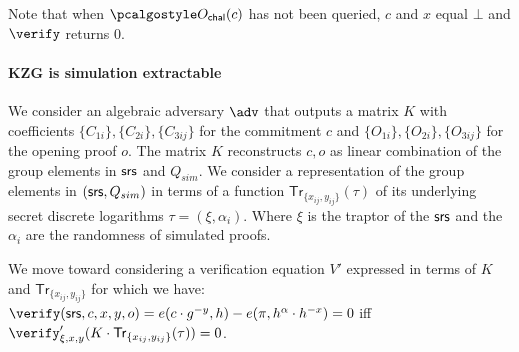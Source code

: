 \documentclass[runningheads,11pt]{llncs}
\begin{document}
\begin{definition}
\end{definition}
Note that when $\oraclec(c)$ has not been queried, $c$ and $x$ equal $\bot$ and $\verify$ returns $0$.

\paragraph{KZG is simulation extractable}

We consider an algebraic adversary $\adv$ that outputs a matrix $K$ with coefficients $\{C_{{1i}}\},\{C_{{2i}}\}, \{C_{{3ij}}\}$ for the commitment $c$ and $\{O_{{1i}}\},\{O_{{2i}}\}, \{O_{{3ij}}\}$ for the opening proof $o$. The matrix $K$ reconstructs $c,o$ as linear combination of the group elements in $\mathsf{srs}$ and $Q_{sim}$. We consider a representation of the group elements in $(\mathsf{srs},Q_{{sim}})$ in terms of a function $\mathsf{Tr}_{\{x_{ij},y_{ij}\}}(\tau)$ of its underlying secret discrete logarithms $\tau=(\xi,\alpha_{i})$. Where $\xi$ is the traptor of the $\mathsf{srs}$ and the $\alpha_{i}$ are the randomness of simulated proofs.

We move toward considering a verification equation $V'$ expressed in terms of $K$ and $\mathsf{Tr}_{\{x_{ij},y_{ij}\}}$ for which we have:
$\verify(\srs,c,x,y,o) =  e(c \cdot  g^{-y}, h) - e(\pi , h^{\alpha}\cdot h^{-x}) = 0$ iff $\verify'_{{\xi,x,y}}(K \cdot \mathsf{Tr}_{\{x_{ij},y_{ij}\}} (\tau)) = 0$.
\end{document}
